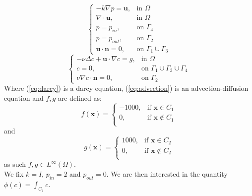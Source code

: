 \documentclass[conference]{IEEEtran}
\begin{document}
\begin{equation}
    \begin{cases}
      -k \nabla p = \textbf{u} , & \text{in $\Omega$}  \\
      \nabla \cdot \textbf{u}, & \text{in $\Omega$} \\
      p=p_{in} , & \text{on $\Gamma_4$} \\
      p=p_{out} , & \text{on $\Gamma_2$} \\
      \textbf{u} \cdot \textbf{n} = 0, & \text{on } \Gamma_1 \cup \Gamma_3
    \end{cases}
    \label{eq:darcy}
\end{equation}
\begin{equation}
    \begin{cases}
      -\nu \Delta c + \textbf{u} \cdot \nabla c = g ,& \text{in $\Omega$}  \\
      c = 0, & \text{on } \Gamma_1 \cup \Gamma_3 \cup \Gamma_4 \\
      \nu \nabla c \cdot \textbf{n} = 0, & \text{on } \Gamma_2
    \end{cases}
    \label{eq:advection}
\end{equation}
Where (\ref{eq:darcy}) is a darcy equation, (\ref{eq:advection}) is an advection-diffusion equation and $f,g$ are defined as:
\begin{equation}
	f(\textbf{x})=
    \begin{cases}
      -1000,   & \text{if } \textbf{x} \in C_1 \\
      0,       & \text{if } \textbf{x} \notin C_1 \\
    \end{cases}
\end{equation}
and
\begin{equation}
	g(\textbf{x})=
    \begin{cases}
      1000, & \text{if } \textbf{x} \in C_2 \\
      0,    & \text{if } \textbf{x} \notin C_2 \\
    \end{cases}
\end{equation}
as such $f,g \in L^{\infty}(\Omega)$.\\
We fix $k=I$, $p_{in} = 2$ and $p_{out} = 0$. We are then interested in the quantity $\phi(c) = \int_{C_1} c$.

\end{document}
